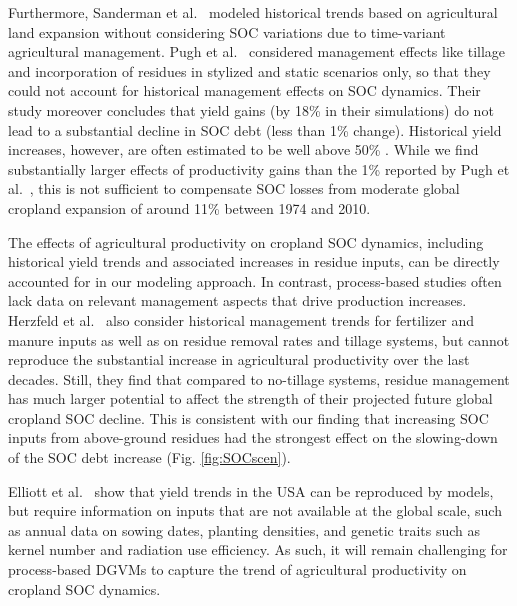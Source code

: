 \documentclass[gc, manuscript]{copernicus}
\begin{document}
Furthermore, Sanderman et al.~\citeyearpar{sanderman_soil_2017} modeled historical trends based on agricultural land expansion without considering SOC variations due to time-variant agricultural management. Pugh et al.~\citeyearpar{pugh_simulated_2015} considered management effects like tillage and incorporation of residues in stylized and static scenarios only, so that they could not account for historical management effects on SOC dynamics. Their study moreover concludes that yield gains (by 18\% in their simulations) do not lead to a substantial decline in SOC debt (less than 1\% change). Historical yield increases, however, are often estimated to be well above 50\% \citep{pellegrini_crop_2018, ray_recent_2012, rudel_agricultural_2009}. While we find substantially larger effects of productivity gains than the 1\% reported by Pugh et al.~\citeyearpar{pugh_simulated_2015}, this is not sufficient to compensate SOC losses from moderate global cropland expansion of around 11\% between 1974 and 2010.

The effects of agricultural productivity on cropland SOC dynamics, including historical yield trends and associated increases in residue inputs, can be directly accounted for in our modeling approach. In contrast, process-based studies \citep{pugh_simulated_2015, herzfeld_soc_2021} often lack data on relevant management aspects that drive production increases. Herzfeld et al.~\citeyearpar{herzfeld_soc_2021} also consider historical management trends for fertilizer and manure inputs as well as on residue removal rates and tillage systems, but cannot reproduce the substantial increase in agricultural productivity over the last decades. Still, they find that compared to no-tillage systems, residue management has much larger potential to affect the strength of their projected future global cropland SOC decline. This is consistent with our finding that increasing SOC inputs from above-ground residues had the strongest effect on the slowing-down of the SOC debt increase (Fig. \ref{fig:SOCscen}).

Elliott et al.~\citeyearpar{elliott_management_trends_2018} show that yield trends in the USA can be reproduced by models, but require information on inputs that are not available at the global scale, such as annual data on sowing dates, planting densities, and genetic traits such as kernel number and radiation use efficiency. As such, it will remain challenging for process-based DGVMs to capture the trend of agricultural productivity on cropland SOC dynamics.
\end{document}
